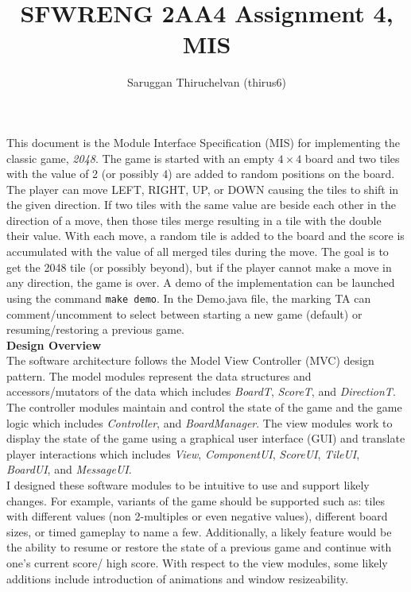 \documentclass[12pt]{article}
\title{SFWRENG 2AA4 Assignment 4, MIS}
\author{Saruggan Thiruchelvan (thirus6)}
\newcommand{\code}[1]{\texttt{#1}}
\begin{document}
\maketitle

This document is the Module Interface Specification (MIS) for implementing the classic game, \emph{2048}. The game is started with an empty $4 \times 4$ board and two tiles with the value of 2 (or possibly 4) are added to random positions on the board. The player can move LEFT, RIGHT, UP, or DOWN causing the tiles to shift in the given direction. If two tiles with the same value are beside each other in the direction of a move, then those tiles merge resulting in a tile with the double their value. With each move, a random tile is added to the board and the score is accumulated with the value of all merged tiles during the move. The goal is to get the 2048 tile (or possibly beyond), but if the player cannot make a move in any direction, the game is over. A demo of the implementation can be launched using the command \code{make demo}. In the Demo.java file, the marking TA can comment/uncomment to select between starting a new game (default) or resuming/restoring a previous game.\\

\textbf{Design Overview} \\

The software architecture follows the Model View Controller (MVC) design pattern. The model modules represent the data structures and accessors/mutators of the data which includes \textit{BoardT}, \textit{ScoreT}, and \textit{DirectionT}. The controller modules maintain and control the state of the game and the game logic which includes \textit{Controller}, and \textit{BoardManager}. The view modules work to display the state of the game using a graphical user interface (GUI) and translate player interactions which includes \textit{View}, \textit{ComponentUI}, \textit{ScoreUI}, \textit{TileUI}, \textit{BoardUI}, and \textit{MessageUI}. \\

I designed these software modules to be intuitive to use and support likely changes. For example, variants of the game should be supported such as: tiles with different values (non 2-multiples or even negative values), different board sizes, or timed gameplay to name a few. Additionally, a likely feature would be the ability to resume or restore the state of a previous game and continue with one's current score/ high score. With respect to the view modules, some likely additions include introduction of  animations and window resizeability. \\
\end{document}
